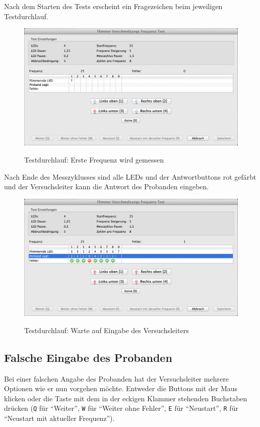\documentclass[11pt,accentcolor=tud2a,colorback,noheadingspace,bigchapter]{tudreport}
\begin{document}
Nach dem Starten des Tests erscheint ein Fragezeichen beim jeweiligen Testdurchlauf.

\begin{figure}[H]
	\centering
	\includegraphics[width=\textwidth]{testrunner_running.png}
	\label{fig:testrunner-running}
	\caption{Testdurchlauf: Erste Frequenz wird gemessen}
\end{figure}


Nach Ende des Messzyklusses sind alle LEDs und der Antwortbuttons rot gefärbt und der Versuchsleiter kann die Antwort des Probanden eingeben.

\begin{figure}[H]
	\centering
	\includegraphics[width=\textwidth]{testrunner_waiting.png}
	\label{fig:testrunner-waiting}
	\caption{Testdurchlauf: Warte auf Eingabe des Versuchsleiters}
\end{figure}


\subsection{Falsche Eingabe des Probanden}
\label{tests:falsche-eingabe-des-probanden}
Bei einer falschen Angabe des Probanden hat der Versuchsleiter mehrere Optionen wie er nun vorgehen möchte. Entweder die Buttons mit der Maus klicken oder die Taste mit dem in der eckigen Klammer stehenden Buchstaben drücken (\texttt{Q} für ``Weiter'', \texttt{W} für ``Weiter ohne Fehler'', \texttt{E} für ``Neustart'', \texttt{R} für ``Neustart mit aktueller Frequenz'').
\end{document}
